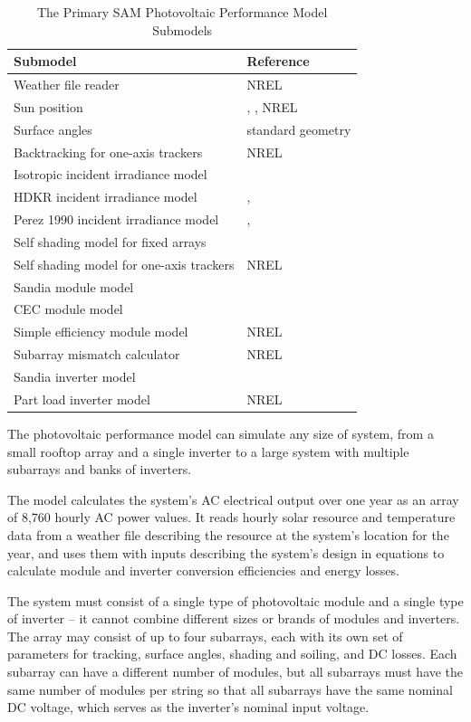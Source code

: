 \documentclass[12pt,letterpaper]{article}
\begin{document}
\begin{table}
\begin{center}
\caption{The Primary SAM Photovoltaic Performance Model Submodels}
\begin{tabular}{ll}
\midrule
Submodel & Reference\\
\midrule
Weather file reader & NREL\\
Sun position & \citet{michalsky1988}, \citet{iqbal1983}, NREL\\
Surface angles & standard geometry\\
Backtracking for one-axis trackers & NREL\\
Isotropic incident irradiance model & \citet{liu1963}\\
HDKR incident irradiance model & \citet{duffie2013}, \citet{reindl1988}\\
Perez 1990 incident irradiance model & \citet{perez1988}, \citet{perez1990}\\
Self shading model for fixed arrays & \citet{deline2013a}\\
Self shading model for one-axis trackers & NREL \\
Sandia module model & \citet{king2004}\\
CEC module model & \citet{desoto2004a}\\
Simple efficiency module model & NREL\\
Subarray mismatch calculator & NREL \\
Sandia inverter model & \citet{king2007}\\
Part load inverter model & NREL\\
\hline
\end{tabular}
\label{tab-submodels}
\end{center}
\end{table}


The photovoltaic performance model can simulate any size of system, from a small rooftop array and a single inverter to a large system with multiple subarrays and banks of inverters.

The model calculates the system's AC electrical output over one year as an array of 8,760 hourly AC power values. It reads hourly solar resource and temperature data from a weather file describing the resource at the system's location for the year, and uses them with inputs describing the system's design in equations to calculate module and inverter conversion efficiencies and energy losses.

The system must consist of a single type of photovoltaic module and a single type of inverter -- it cannot combine different sizes or brands of modules and inverters. The array may consist of up to four subarrays, each with its own set of parameters for tracking, surface angles, shading and soiling, and DC losses. Each subarray can have a different number of modules, but all subarrays must have the same number of modules per string so that all subarrays have the same nominal DC voltage, which serves as the inverter's nominal input voltage.
\end{document}
